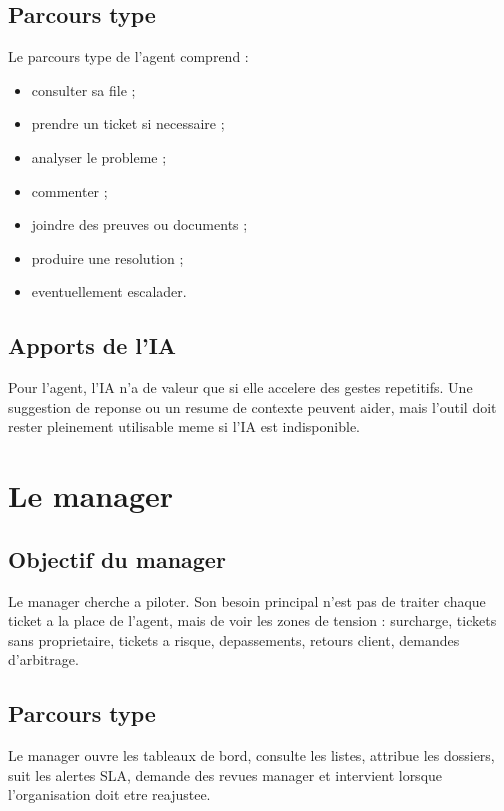 \subsection{Parcours type}

Le parcours type de l'agent comprend :

\begin{itemize}[leftmargin=1.2cm]
  \item consulter sa file ;
  \item prendre un ticket si necessaire ;
  \item analyser le probleme ;
  \item commenter ;
  \item joindre des preuves ou documents ;
  \item produire une resolution ;
  \item eventuellement escalader.
\end{itemize}

\subsection{Apports de l'IA}

Pour l'agent, l'IA n'a de valeur que si elle accelere des gestes repetitifs. Une suggestion de reponse ou un resume de contexte peuvent aider, mais l'outil doit rester pleinement utilisable meme si l'IA est indisponible.

\section{Le manager}

\subsection{Objectif du manager}

Le manager cherche a piloter. Son besoin principal n'est pas de traiter chaque ticket a la place de l'agent, mais de voir les zones de tension : surcharge, tickets sans proprietaire, tickets a risque, depassements, retours client, demandes d'arbitrage.

\subsection{Parcours type}

Le manager ouvre les tableaux de bord, consulte les listes, attribue les dossiers, suit les alertes SLA, demande des revues manager et intervient lorsque l'organisation doit etre reajustee.

